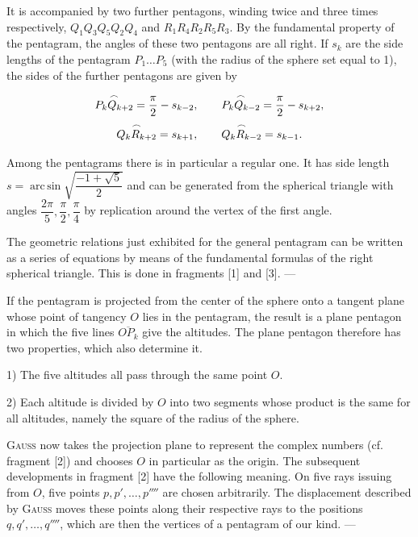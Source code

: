 \begin{center}\end{center}

It is accompanied by two further pentagons, winding twice and three times respectively,
$Q_1Q_3Q_5Q_2Q_4$ and $R_1R_4R_2R_5R_3$. By the fundamental property of the pentagram, the
angles of these two pentagons are all right. If $s_k$ are the side lengths of the pentagram $P_1\ldots P_5$ (with
the radius of the sphere set equal to 1), the sides of the further pentagons are given by

\[
\overset{\frown}{P_kQ_{k+2}} = \frac{\pi}{2} - s_{k-2}, \qquad \overset{\frown}{P_kQ_{k-2}} = \frac{\pi}{2} - s_{k+2},
\]
\[
\overset{\frown}{Q_kR_{k+2}} = s_{k+1}, \qquad \overset{\frown}{Q_kR_{k-2}} = s_{k-1}.
\]

Among the pentagrams there is in particular a regular one. It has side length
$s = \operatorname{arc\,sin}\sqrt{\dfrac{-1+\sqrt{5}}{2}}$ and can be generated from the spherical triangle with
angles $\dfrac{2\pi}{5}, \dfrac{\pi}{2}, \dfrac{\pi}{4}$ by replication around the vertex of the
first angle.

The geometric relations just exhibited for the general pentagram can be written as a series of
equations by means of the fundamental formulas of the right spherical triangle.
This is done in fragments [1] and [3]. ---

If the pentagram is projected from the center of the sphere onto a tangent plane whose point of
tangency $O$ lies in the pentagram, the result is a plane pentagon in which the five
lines $\overline{OP_k}$ give the altitudes. The plane pentagon therefore has two properties,
which also determine it.

1) The five altitudes all pass through the same point $O$.

2) Each altitude is divided by $O$ into two segments whose product is the same for all altitudes,
namely the square of the radius of the sphere.

\textsc{Gauss} now takes the projection plane to represent the complex numbers (cf. fragment [2])
and chooses $O$ in particular as the origin. The subsequent developments in fragment [2]
have the following meaning. On five rays issuing from $O$, five
points $p, p', \ldots, p''''$ are chosen arbitrarily. The displacement described by \textsc{Gauss}
moves these points along their respective rays to the positions $q, q', \ldots, q''''$,
which are then the vertices of a pentagram of our kind. ---

